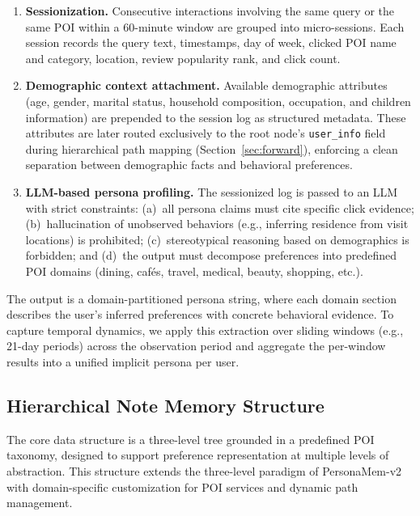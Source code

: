 \documentclass[sigconf,review,anonymous]{acmart}
\begin{document}
\begin{enumerate}
    \item \textbf{Sessionization.} Consecutive interactions involving the same query or the same POI within a 60-minute window are grouped into micro-sessions. Each session records the query text, timestamps, day of week, clicked POI name and category, location, review popularity rank, and click count.

    \item \textbf{Demographic context attachment.} Available demographic attributes (age, gender, marital status, household composition, occupation, and children information) are prepended to the session log as structured metadata. These attributes are later routed exclusively to the root node's \texttt{user\_info} field during hierarchical path mapping (Section~\ref{sec:forward}), enforcing a clean separation between demographic facts and behavioral preferences.

    \item \textbf{LLM-based persona profiling.} The sessionized log is passed to an LLM with strict constraints: (a)~all persona claims must cite specific click evidence; (b)~hallucination of unobserved behaviors (e.g., inferring residence from visit locations) is prohibited; (c)~stereotypical reasoning based on demographics is forbidden; and (d)~the output must decompose preferences into predefined POI domains (dining, caf\'{e}s, travel, medical, beauty, shopping, etc.).
\end{enumerate}

The output is a domain-partitioned persona string, where each domain section describes the user's inferred preferences with concrete behavioral evidence. To capture temporal dynamics, we apply this extraction over sliding windows (e.g., 21-day periods) across the observation period and aggregate the per-window results into a unified implicit persona per user.


\subsection{Hierarchical Note Memory Structure}

The core data structure is a three-level tree grounded in a predefined POI taxonomy, designed to support preference representation at multiple levels of abstraction. This structure extends the three-level paradigm of PersonaMem-v2~\cite{personamem-v2} with domain-specific customization for POI services and dynamic path management.
\end{document}
